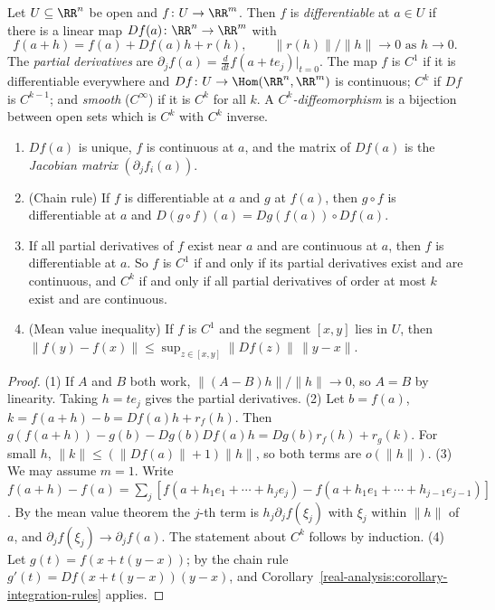 \begin{definition}\label{real-analysis:definition-differentiable}
Let $U \subseteq \RR^n$ be open and $f \colon U \to \RR^m$. Then $f$ is \emph{differentiable} at $a \in U$ if there is a linear map $Df(a) \colon \RR^n \to \RR^m$ with
\[
f(a + h) = f(a) + Df(a)h + r(h), \qquad \|r(h)\|/\|h\| \to 0 \text{ as } h \to 0.
\]
The \emph{partial derivatives} are $\partial_jf(a) = \frac{d}{dt}f(a + te_j)|_{t=0}$. The map $f$ is $C^1$ if it is differentiable everywhere and $Df \colon U \to \Hom(\RR^n, \RR^m)$ is continuous; $C^k$ if $Df$ is
$C^{k-1}$; and \emph{smooth} ($C^\infty$) if it is $C^k$ for all $k$. A \emph{$C^k$-diffeomorphism} is a bijection between open sets which is $C^k$ with $C^k$ inverse.
\end{definition}

\begin{proposition}\label{real-analysis:proposition-derivative-basic}
\begin{enumerate}
\item $Df(a)$ is unique, $f$ is continuous at $a$, and the matrix of $Df(a)$ is the \emph{Jacobian matrix} $(\partial_jf_i(a))$.
\item (Chain rule) If $f$ is differentiable at $a$ and $g$ at $f(a)$, then $g \circ f$ is differentiable at $a$ and $D(g \circ f)(a) = Dg(f(a)) \circ Df(a)$.
\item If all partial derivatives of $f$ exist near $a$ and are continuous at $a$, then $f$ is differentiable at $a$. So $f$ is $C^1$ if and only if its partial derivatives exist and are continuous, and
$C^k$ if and only if all partial derivatives of order at most $k$ exist and are continuous.
\item (Mean value inequality) If $f$ is $C^1$ and the segment $[x, y]$ lies in $U$, then $\|f(y) - f(x)\| \leq \sup_{z \in [x, y]}\|Df(z)\|\,\|y - x\|$.
\end{enumerate}
\end{proposition}

\begin{proof}
(1) If $A$ and $B$ both work, $\|(A - B)h\|/\|h\| \to 0$, so $A = B$ by linearity. Taking $h = te_j$ gives the partial derivatives. (2) Let $b = f(a)$, $k = f(a + h) - b = Df(a)h + r_f(h)$. Then
$g(f(a + h)) - g(b) - Dg(b)Df(a)h = Dg(b)r_f(h) + r_g(k)$. For small $h$, $\|k\| \leq (\|Df(a)\| + 1)\|h\|$, so both terms are $o(\|h\|)$. (3) We may assume $m = 1$. Write
$f(a + h) - f(a) = \sum_j[f(a + h_1e_1 + \cdots + h_je_j) - f(a + h_1e_1 + \cdots + h_{j-1}e_{j-1})]$. By the mean value theorem the $j$-th term is $h_j\partial_jf(\xi_j)$ with $\xi_j$ within $\|h\|$ of $a$, and
$\partial_jf(\xi_j) \to \partial_jf(a)$. The statement about $C^k$ follows by induction. (4) Let $g(t) = f(x + t(y - x))$; by the chain rule $g'(t) = Df(x + t(y - x))(y - x)$, and
Corollary~\ref{real-analysis:corollary-integration-rules} applies.
\end{proof}

